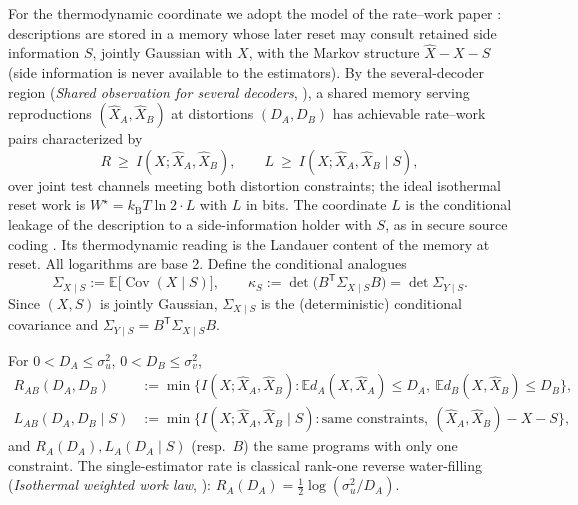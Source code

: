 \documentclass[11pt]{article}
\newcommand{\E}{\mathbb{E}}\newcommand{\tr}{\operatorname{tr}}
\newcommand{\Cov}{\operatorname{Cov}}\newcommand{\Var}{\operatorname{Var}}
\newcommand{\hX}{\widehat X}\newcommand{\hY}{\widehat Y}
\newcommand{\kb}{k_{\mathrm B}}
\begin{document}
For the thermodynamic coordinate we adopt the model of the rate--work
paper \cite{bondlandauerV}: descriptions are stored in a memory
whose later reset may consult retained side information $S$, jointly
Gaussian with $X$, with the Markov structure $\hX-X-S$ (side information is
never available to the estimators). By the several-decoder region
(\emph{Shared observation for several decoders}, \cite{bondlandauerV}), a
shared memory serving reproductions
$(\hX_A,\hX_B)$ at distortions $(D_A,D_B)$ has achievable rate--work pairs
characterized by
\begin{equation}
R\ \ge\ I(X;\hX_A,\hX_B),
\qquad
L\ \ge\ I(X;\hX_A,\hX_B\mid S),
\label{eq:coords}
\end{equation}
over joint test channels meeting both distortion constraints; the ideal
isothermal reset work is $W^\star=\kb T\ln2\cdot L$ with $L$ in bits. The
coordinate $L$ is the conditional leakage of the description to a
side-information holder with $S$, as in secure source coding
\cite{villard2013,ekrem2013}. Its thermodynamic reading is the Landauer content
of the memory at reset. All logarithms are base 2. Define the conditional analogues
\begin{equation}
\Sigma_{X\mid S}:=\E\bigl[\Cov(X\mid S)\bigr],\qquad
\kappa_S:=\det\bigl(B^{\mathsf T}\Sigma_{X\mid S}B\bigr)
=\det\Sigma_{Y\mid S}.
\label{eq:kappaS}
\end{equation}
Since $(X,S)$ is jointly Gaussian, $\Sigma_{X\mid S}$ is the (deterministic)
conditional covariance and $\Sigma_{Y\mid S}=B^{\mathsf T}\Sigma_{X\mid S}B$.

\begin{definition}\label{def:optima}
For $0<D_A\le\sigma_u^2$, $0<D_B\le\sigma_v^2$,
\begin{align*}
R_{AB}(D_A,D_B)&:=\min\bigl\{I(X;\hX_A,\hX_B):\E d_A(X,\hX_A)\le D_A,\
\E d_B(X,\hX_B)\le D_B\bigr\},\\
L_{AB}(D_A,D_B\mid S)&:=\min\bigl\{I(X;\hX_A,\hX_B\mid S):\text{same
constraints},\ (\hX_A,\hX_B)-X-S\bigr\},
\end{align*}
and $R_A(D_A),L_A(D_A\mid S)$ (resp.\ $B$) the same programs with only one
constraint. The single-estimator rate is classical rank-one reverse
water-filling (\emph{Isothermal weighted work law},
\cite{bondlandauerV}):
$R_A(D_A)=\tfrac12\log(\sigma_u^2/D_A)$.
\end{definition}
\end{document}
